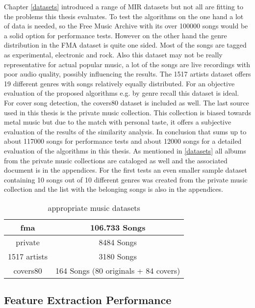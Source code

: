 Chapter \ref{datasets} introduced a range of MIR datasets but not all are fitting to the problems this thesis evaluates. To test the algorithms on the one hand a lot of data is needed, so the Free Music Archive with its over 100000 songs would be a solid option for performance tests. However on the other hand the genre distribution in the FMA dataset is quite one sided. Most of the songs are tagged as experimental, electronic and rock. Also this dataset may not be really representative for actual popular music, a lot of the songs are live recordings with poor audio quality, possibly influencing the results.
The 1517 artists dataset offers 19 different genres with songs relatively equally distributed. For an objective evaluation of the proposed algorithms e.g. by genre recall this dataset is ideal. For cover song detection, the covers80 dataset is included as well.
The last source used in this thesis is the private music collection. This collection is biased towards metal music but due to the match with personal taste, it offers a subjective evaluation of the results of the similarity analysis. 
In conclusion that sums up to about 117000 songs for performance tests and about 12000 songs for a detailed evaluation of the algorithms in this thesis. As mentioned in \ref{datasets} all albums from the private music collections are cataloged as well and the associated document is in the appendices. For the first tests an even smaller sample dataset containing 10 songs out of 10 different genres was created from the private music collection and the list with the belonging songs is also in the appendices.

\begin{table}[h]
	\label{used_dsets}
	\begin{center}
		\begin{tabular}{|c||c|}
			\hline
			fma & 106.733 Songs\\
			\hline
			private & 8484 Songs\\
			\hline
			1517 artists & 3180 Songs\\
			\hline
			covers80 & 164 Songs (80 originals + 84 covers)\\
			\hline
		\end{tabular}
	\end{center}
	\caption{appropriate music datasets}
\end{table}
\FloatBarrier

\subsection{Feature Extraction Performance}

